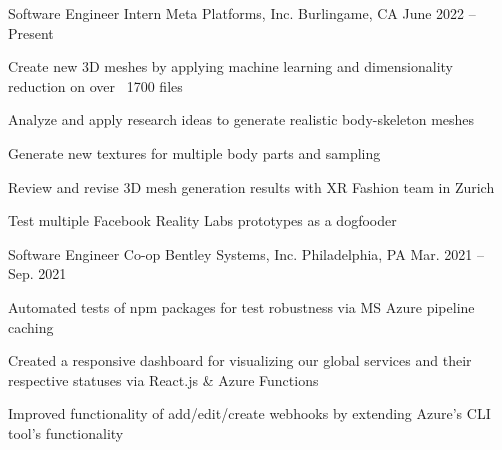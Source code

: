 

\begin{cventries}
  \cventry
  {Software Engineer Intern} %
  {Meta Platforms, Inc.} %
  {Burlingame, CA} %
  {June 2022 -- Present} %
  {
    \begin{cvitems} %
      \item {Create new 3D meshes by applying machine learning and dimensionality reduction on over ~1700 files}
      \item {Analyze and apply research ideas to generate realistic body-skeleton meshes}
      \item {Generate new textures for multiple body parts and sampling}
      \item {Review and revise 3D mesh generation results with XR Fashion team in Zurich}
      \item {Test multiple Facebook Reality Labs prototypes as a dogfooder}
    \end{cvitems}
  }

  \cventry
  {Software Engineer Co-op} %
  {Bentley Systems, Inc.} %
  {Philadelphia, PA} %
  {Mar. 2021 -- Sep. 2021} %
  {
    \begin{cvitems} %
      \item {Automated tests of npm packages for test robustness via MS Azure pipeline caching}
      \item {Created a responsive dashboard for visualizing our global services and their respective statuses via React.js \& Azure Functions}
      \item {Improved functionality of add/edit/create webhooks by extending Azure's CLI tool's functionality}
    \end{cvitems}
  }


\end{cventries}
